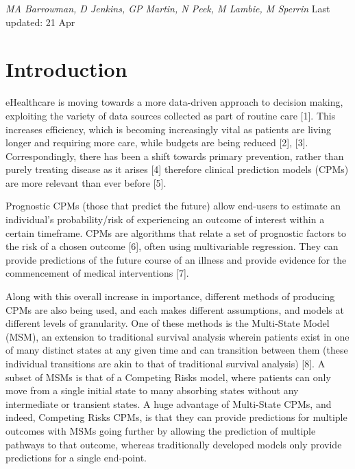 \documentclass[12pt,PhD,twoside,openright]{muthesis}
\begin{document}
\emph{MA Barrowman, D Jenkins, GP Martin, N Peek, M Lambie, M Sperrin}
Last updated: 21 Apr

\hypertarget{introduction-2}{%
\section{Introduction}\label{introduction-2}}

eHealthcare is moving towards a more data-driven approach to decision making, exploiting the variety of data sources collected as part of routine care {[}1{]}. This increases efficiency, which is becoming increasingly vital as patients are living longer and requiring more care, while budgets are being reduced {[}2{]}, {[}3{]}. Correspondingly, there has been a shift towards primary prevention, rather than purely treating disease as it arises {[}4{]} therefore clinical prediction models (CPMs) are more relevant than ever before {[}5{]}.

Prognostic CPMs (those that predict the future) allow end-users to estimate an individual's probability/risk of experiencing an outcome of interest within a certain timeframe. CPMs are algorithms that relate a set of prognostic factors to the risk of a chosen outcome {[}6{]}, often using multivariable regression. They can provide predictions of the future course of an illness and provide evidence for the commencement of medical interventions {[}7{]}.

Along with this overall increase in importance, different methods of producing CPMs are also being used, and each makes different assumptions, and models at different levels of granularity. One of these methods is the Multi-State Model (MSM), an extension to traditional survival analysis wherein patients exist in one of many distinct states at any given time and can transition between them (these individual transitions are akin to that of traditional survival analysis) {[}8{]}. A subset of MSMs is that of a Competing Risks model, where patients can only move from a single initial state to many absorbing states without any intermediate or transient states. A huge advantage of Multi-State CPMs, and indeed, Competing Risks CPMs, is that they can provide predictions for multiple outcomes with MSMs going further by allowing the prediction of multiple pathways to that outcome, whereas traditionally developed models only provide predictions for a single end-point.
\end{document}
